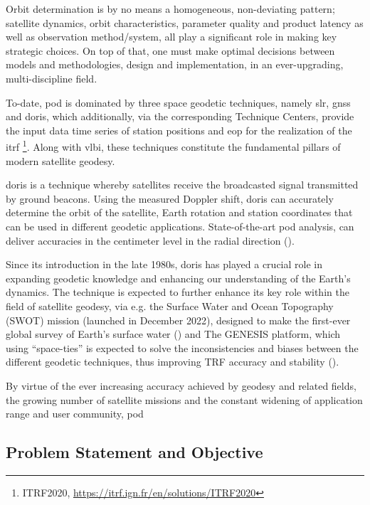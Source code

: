 Orbit determination is by no means a homogeneous, non-deviating pattern; satellite 
dynamics, orbit characteristics, parameter quality and product latency as well 
as observation method/system, all play a significant role in making key strategic 
choices. On top of that, one must make optimal decisions between models and
methodologies, design and implementation, in an ever-upgrading, multi-discipline 
field.

To-date, \gls{pod} is dominated by three space geodetic techniques, namely \gls{slr}, \gls{gnss} and
\gls{doris}, which additionally, via the corresponding Technique Centers, provide the input
data time series of station positions and \gls{eop} for the realization of the \gls{itrf}
\footnote{ITRF2020, \url{https://itrf.ign.fr/en/solutions/ITRF2020}}. Along with \gls{vlbi}, these
techniques constitute the fundamental pillars of modern satellite geodesy.

\gls{doris} is a technique whereby satellites receive the broadcasted signal 
transmitted by ground beacons. Using the measured Doppler shift, \gls{doris} 
can accurately determine the orbit of the satellite, Earth rotation and 
station coordinates that can be used in different geodetic applications.
State-of-the-art \gls{pod} analysis, can deliver accuracies in the 
centimeter level in the radial direction (\cite{Rudenko2023}).

Since its introduction in the late 1980s, \gls{doris} has played a crucial role 
in expanding geodetic knowledge and enhancing our understanding of the Earth’s 
dynamics. The technique is expected to further enhance its key role within the 
field of satellite geodesy, via e.g. the Surface Water and Ocean Topography (SWOT) 
mission (launched in December 2022), designed to make the first-ever global 
survey of Earth's surface water (\cite{Biancamaria2016}) and The GENESIS platform, 
which using ``space-ties'' is expected to solve the inconsistencies and biases 
between the different geodetic techniques, thus improving TRF accuracy and stability 
(\cite{Delva2023}).

By virtue of the ever increasing accuracy achieved by geodesy and related fields, 
the growing number of satellite missions and the constant widening of application 
range and user community, \gls{pod} 

\subsection{Problem Statement and Objective}\label{ssec:statement-and-objective}

